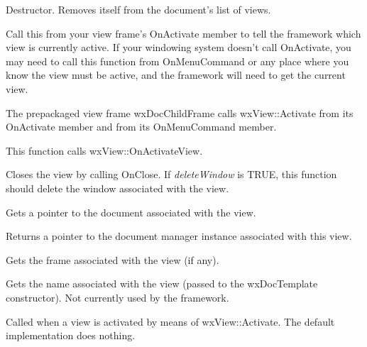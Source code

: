 Destructor. Removes itself from the document's list of views.



Call this from your view frame's OnActivate member to tell the framework which view is
currently active. If your windowing system doesn't call OnActivate, you may need to
call this function from OnMenuCommand or any place where you know the view must
be active, and the framework will need to get the current view.

The prepackaged view frame wxDocChildFrame calls wxView::Activate from its OnActivate member
and from its OnMenuCommand member.

This function calls wxView::OnActivateView.



Closes the view by calling OnClose. If {\it deleteWindow} is TRUE, this function should
delete the window associated with the view.



Gets a pointer to the document associated with the view.



Returns a pointer to the document manager instance associated with this view.



Gets the frame associated with the view (if any).



Gets the name associated with the view (passed to the wxDocTemplate constructor).
Not currently used by the framework.



Called when a view is activated by means of wxView::Activate. The default implementation does
nothing.

